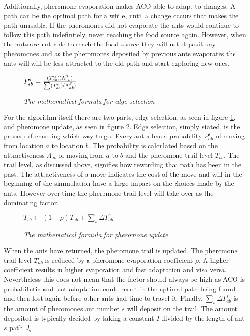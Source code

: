 Additionally, pheromone evaporation makes ACO able to adapt to changes. A path can be the optimal path for a while, until a change
occurs that makes the path unusable. If the pheromones did not evaporate the ants would continue to follow this path indefinitely,
never reaching the food source again. However, when the ants are not able to reach the food source they will not deposit any
pheromones and as the pheromones deposited by previous ants evaporates the ants will will be less attracted to the old path
and start exploring new ones.
 

\begin{figure}[h]
\centering
\begin{math}
P^s_{ab} = {(T^\alpha_{ab})(\Lambda^\beta_{ab}) \over \sum (T^\alpha_{ab})(\Lambda^\beta_{ab})}
\end{math}
\caption{\textit{The mathematical formula for edge selection}}
\label{fig:edge}
\end{figure}

For the algorithm itself there are two parts, edge selection, as seen in figure \ref{fig:edge}, and pheromone update, as seen in figure \ref{fig:update}. 
Edge selection, simply stated, is the process of choosing which way to go. Every ant $s$ has a probability $P^s_{ab}$ of moving from location $a$ to location $b$. The probability
is calculated based on the attractiveness $\Lambda_{ab}$  of moving from $a$ to $b$ and the pheromone trail level $T_{ab}$. The trail level,
as discussed above, signifies how rewarding that path has been in the past. The attractiveness of a move indicates the cost of the move and 
will in the beginning of the simmulation have a large impact on the choices made by the ants. However over time the pheromone trail level will take over as the
dominating factor.

\begin{figure}[h]
\centering
\begin{math}
T_{ab} \leftarrow (1 - \rho)T_{ab} + \sum \limits_{s} \Delta T^s_{ab}
\end{math}
\caption{\textit{The mathematical formula for pheromone update}}
\label{fig:update}
\end{figure}

When the ants have returned, the pheromone trail is updated. The pheromone trail level $T_{ab}$ is reduced by a pheromone evaporation
coefficient $\rho$. A higher coefficient results in higher evaporation and fast adaptation and visa versa. Nevertheless this does not mean
that the factor should always be high as ACO is probabilistic and fast adaptation could result in the optimal path being found and then lost
again before other ants had time to travel it. Finally, $\sum \limits_{s} \Delta T^s_{ab}$ is the amount of pheromones ant number $s$ will deposit on
the trail. The amount deposited is typically decided by taking a constant $I$ divided by the length of ant $s$ path $J_s$

